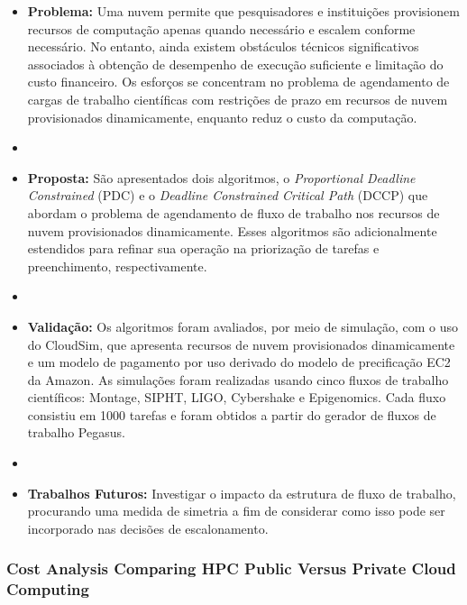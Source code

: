 \documentclass[tese,capa]{texufpel}
\begin{document}
\begin{itemize}[label={},noitemsep]
  \item \textbf{Problema:} Uma nuvem permite que pesquisadores e instituições provisionem recursos de computação apenas quando necessário e escalem conforme necessário. No entanto, ainda existem obstáculos técnicos significativos associados à obtenção de desempenho de execução suficiente e limitação do custo financeiro. Os esforços se concentram no problema de agendamento de cargas de trabalho científicas com restrições de prazo em recursos de nuvem provisionados dinamicamente, enquanto reduz o custo da computação.
  \item 
  \item \textbf{Proposta:} São apresentados dois algoritmos, o \textit{Proportional Deadline Constrained} (PDC) e o \textit{Deadline Constrained Critical Path} (DCCP) que abordam o problema de agendamento de fluxo de trabalho nos recursos de nuvem provisionados dinamicamente. Esses algoritmos são adicionalmente estendidos para refinar sua operação na priorização de tarefas e preenchimento, respectivamente.
  \item 
  \item \textbf{Validação:} Os algoritmos foram avaliados, por meio de simulação, com o uso do CloudSim, que apresenta recursos de nuvem provisionados dinamicamente e um modelo de pagamento por uso derivado do modelo de precificação EC2 da Amazon. As simulações foram realizadas usando cinco fluxos de trabalho científicos: Montage, SIPHT, LIGO, Cybershake e Epigenomics. Cada fluxo consistiu em 1000 tarefas e foram obtidos a partir do gerador de fluxos de trabalho Pegasus.
  \item 
  \item \textbf{Trabalhos Futuros:} Investigar o impacto da estrutura de fluxo de trabalho, procurando uma medida de simetria a fim de considerar como isso pode ser incorporado nas decisões de escalonamento.
\end{itemize}

\subsubsection{Cost Analysis Comparing HPC Public Versus Private Cloud Computing \cite{dreherCostAnalysisComparing2017e}}
\end{document}
